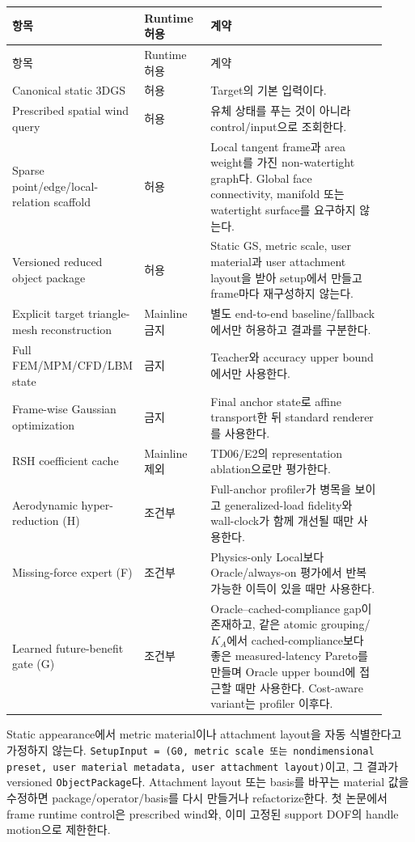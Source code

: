 \documentclass[10pt,a4paper]{article}
\newcommand{\code}[1]{\texttt{#1}}
\begin{document}
\begin{longtable}{L{0.23\linewidth}L{0.18\linewidth}L{0.51\linewidth}}
\toprule
항목 & Runtime 허용 & 계약 \\
\midrule
\endfirsthead
\toprule
항목 & Runtime 허용 & 계약 \\
\midrule
\endhead
Canonical static 3DGS & 허용 & Target의 기본 입력이다. \\
Prescribed spatial wind query & 허용 & 유체 상태를 푸는 것이 아니라 control/input으로 조회한다. \\
Sparse point/edge/local-relation scaffold & 허용 & Local tangent frame과 area weight를 가진 non-watertight graph다. Global face connectivity, manifold 또는 watertight surface를 요구하지 않는다. \\
Versioned reduced object package & 허용 & Static GS, metric scale, user material과 user attachment layout을 받아 setup에서 만들고 frame마다 재구성하지 않는다. \\
Explicit target triangle-mesh reconstruction & Mainline 금지 & 별도 end-to-end baseline/fallback에서만 허용하고 결과를 구분한다. \\
Full FEM/MPM/CFD/LBM state & 금지 & Teacher와 accuracy upper bound에서만 사용한다. \\
Frame-wise Gaussian optimization & 금지 & Final anchor state로 affine transport한 뒤 standard renderer를 사용한다. \\
RSH coefficient cache & Mainline 제외 & TD06/E2의 representation ablation으로만 평가한다. \\
Aerodynamic hyper-reduction (H) & 조건부 & Full-anchor profiler가 병목을 보이고 generalized-load fidelity와 wall-clock가 함께 개선될 때만 사용한다. \\
Missing-force expert (F) & 조건부 & Physics-only Local보다 Oracle/always-on 평가에서 반복 가능한 이득이 있을 때만 사용한다. \\
Learned future-benefit gate (G) & 조건부 & Oracle--cached-compliance gap이 존재하고, 같은 atomic grouping/\(K_A\)에서 cached-compliance보다 좋은 measured-latency Pareto를 만들며 Oracle upper bound에 접근할 때만 사용한다. Cost-aware variant는 profiler 이후다. \\
\bottomrule
\end{longtable}

\begin{tcolorbox}[colback=LightBlue,colframe=blue!45!black,title=Setup과 frame runtime의 경계,fonttitle=\bfseries]
Static appearance에서 metric material이나 attachment layout을 자동 식별한다고 가정하지 않는다.
\code{SetupInput = (G0, metric scale 또는 nondimensional preset, user material metadata, user attachment layout)}이고,
그 결과가 versioned \code{ObjectPackage}다.
Attachment layout 또는 basis를 바꾸는 material 값을 수정하면 package/operator/basis를 다시 만들거나 refactorize한다.
첫 논문에서 frame runtime control은 prescribed wind와, 이미 고정된 support DOF의 handle motion으로 제한한다.
\end{tcolorbox}
\end{document}
